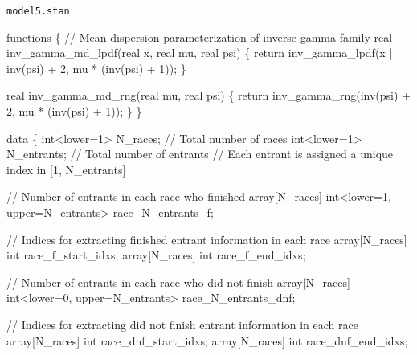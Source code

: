 \documentclass[
  letterpaper,
  DIV=11,
  numbers=noendperiod]{scrartcl}
\newenvironment{Shaded}{\begin{snugshade}}{\end{snugshade}}
\newcommand{\CommentTok}[1]{\textcolor[rgb]{0.37,0.37,0.37}{#1}}
\newcommand{\ControlFlowTok}[1]{\textcolor[rgb]{0.00,0.23,0.31}{#1}}
\newcommand{\DataTypeTok}[1]{\textcolor[rgb]{0.68,0.00,0.00}{#1}}
\newcommand{\DecValTok}[1]{\textcolor[rgb]{0.68,0.00,0.00}{#1}}
\newcommand{\KeywordTok}[1]{\textcolor[rgb]{0.00,0.23,0.31}{#1}}
\newcommand{\NormalTok}[1]{\textcolor[rgb]{0.00,0.23,0.31}{#1}}
\begin{document}
\begin{codelisting}

\caption{\texttt{model5.stan}}

\begin{Shaded}
\begin{Highlighting}[]
\KeywordTok{functions}\NormalTok{ \{}
  \CommentTok{// Mean{-}dispersion parameterization of inverse gamma family}
  \DataTypeTok{real}\NormalTok{ inv\_gamma\_md\_lpdf(}\DataTypeTok{real}\NormalTok{ x, }\DataTypeTok{real}\NormalTok{ mu, }\DataTypeTok{real}\NormalTok{ psi) \{}
    \ControlFlowTok{return}\NormalTok{ inv\_gamma\_lpdf(x | inv(psi) + }\DecValTok{2}\NormalTok{, mu * (inv(psi) + }\DecValTok{1}\NormalTok{));}
\NormalTok{  \}}

  \DataTypeTok{real}\NormalTok{ inv\_gamma\_md\_rng(}\DataTypeTok{real}\NormalTok{ mu, }\DataTypeTok{real}\NormalTok{ psi) \{}
    \ControlFlowTok{return}\NormalTok{ inv\_gamma\_rng(inv(psi) + }\DecValTok{2}\NormalTok{, mu * (inv(psi) + }\DecValTok{1}\NormalTok{));}
\NormalTok{  \}}
\NormalTok{\}}

\KeywordTok{data}\NormalTok{ \{}
  \DataTypeTok{int}\NormalTok{\textless{}}\KeywordTok{lower}\NormalTok{=}\DecValTok{1}\NormalTok{\textgreater{} N\_races;    }\CommentTok{// Total number of races}
  \DataTypeTok{int}\NormalTok{\textless{}}\KeywordTok{lower}\NormalTok{=}\DecValTok{1}\NormalTok{\textgreater{} N\_entrants; }\CommentTok{// Total number of entrants}
  \CommentTok{// Each entrant is assigned a unique index in [1, N\_entrants]}

  \CommentTok{// Number of entrants in each race who finished}
  \DataTypeTok{array}\NormalTok{[N\_races] }\DataTypeTok{int}\NormalTok{\textless{}}\KeywordTok{lower}\NormalTok{=}\DecValTok{1}\NormalTok{, }\KeywordTok{upper}\NormalTok{=N\_entrants\textgreater{} race\_N\_entrants\_f;}

  \CommentTok{// Indices for extracting finished entrant information in each race}
  \DataTypeTok{array}\NormalTok{[N\_races] }\DataTypeTok{int}\NormalTok{ race\_f\_start\_idxs;}
  \DataTypeTok{array}\NormalTok{[N\_races] }\DataTypeTok{int}\NormalTok{ race\_f\_end\_idxs;}

  \CommentTok{// Number of entrants in each race who did not finish}
  \DataTypeTok{array}\NormalTok{[N\_races] }\DataTypeTok{int}\NormalTok{\textless{}}\KeywordTok{lower}\NormalTok{=}\DecValTok{0}\NormalTok{, }\KeywordTok{upper}\NormalTok{=N\_entrants\textgreater{} race\_N\_entrants\_dnf;}

  \CommentTok{// Indices for extracting did not finish entrant information in each race}
  \DataTypeTok{array}\NormalTok{[N\_races] }\DataTypeTok{int}\NormalTok{ race\_dnf\_start\_idxs;}
  \DataTypeTok{array}\NormalTok{[N\_races] }\DataTypeTok{int}\NormalTok{ race\_dnf\_end\_idxs;}


\end{Highlighting}
\end{Shaded}
\end{codelisting}
\end{document}
